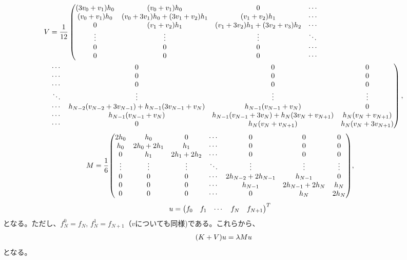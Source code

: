 \documentclass[xelatex,ja=standard]{bxjsarticle}
\begin{document}
\begin{align}
     V&= \frac{1}{12}\left(\mqty{
        \qty(3v_{0} +v_{1})h_0 & \qty(v_{0} +v_{1})h_0 & 0 & \cdots \\
        \qty(v_{0} +v_{1})h_0 & \qty(v_{0} + 3v_{1})h_0 + \qty(3v_{1} +v_{2})h_1 & \qty(v_{1} +v_{2})h_1 & \cdots\\
        0 & \qty(v_{1} +v_{2})h_1 & \qty(v_{1} + 3v_{2})h_1 + \qty(3v_{2} + v_{3})h_2 & \cdots\\
        \vdots & \vdots & \vdots & \ddots\\
        0 & 0 & 0 & \cdots\\
        0 & 0 & 0 & \cdots\\
        }\right.\notag\\
     &  \left.\mqty{
        \cdots  & 0 & 0 & 0 \\
        \cdots & 0 & 0 & 0 \\
        \cdots& 0 & 0 & 0 \\
        \ddots  & \vdots& \vdots& \vdots\\
        \cdots & h_{N-2}\qty(v_{N-2} + 3v_{N-1}) + h_{N-1}\qty(3v_{N-1} + v_{N})& h_{N-1}\qty(v_{N - 1} +v_{N})& 0 \\
        \cdots & h_{N-1}\qty(v_{N - 1} +v_{N})& h_{N-1}\qty(v_{N-1} + 3v_{N}) + h_N\qty(3v_{N} + v_{N +1})& h_N\qty(v_{N} +v_{N+1}) \\
        \cdots &0 & h_N\qty(v_{N} +v_{N+1})& h_N\qty(v_{N} +3v_{N+1}) \\
        }\right),
\end{align}
\begin{align}
    M&=
     \frac{1}{6}\mqty(
     2h_0 & h_0 & 0 & \cdots & 0 & 0 & 0 \\
     h_0 & 2h_0 + 2h_1 & h_1 & \cdots & 0 & 0 & 0 \\
     0 & h_1 & 2h_1 + 2h_2 & \cdots & 0 & 0 & 0 \\
     \vdots & \vdots & \vdots & \ddots & \vdots  & \vdots& \vdots\\
     0 & 0 & 0 & \cdots & 2h_{N - 2} + 2h_{N - 1} & h_{N-1}& 0 \\
     0 & 0 & 0 & \cdots & h_{N-1} & 2h_{N - 1} + 2h_{N}& h_{N} \\
     0 & 0 & 0 & \cdots & 0 & h_{N}& 2h_{N} \\
     ),
\end{align}
\begin{align}
    u&=\mqty(f_0 & f_1 & \cdots & f_N & f_{N+1})^T
\end{align}
となる。ただし、$f_N^0 = f_N,\, f_N^1 = f_{N+1}$（$v$についても同様)である。これらから、
\begin{align}
    \qty(K + V) u = \lambda Mu 
\end{align}
となる。
\end{document}
